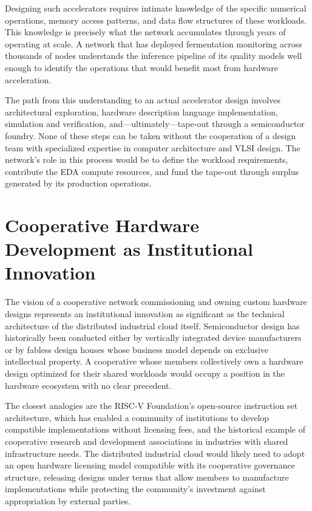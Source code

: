 \documentclass[12pt]{book}
\theoremstyle{definition}
\theoremstyle{remark}
\begin{document}
Designing such accelerators requires intimate knowledge of the
specific numerical operations, memory access patterns, and data
flow structures of these workloads. This knowledge is precisely
what the network accumulates through years of operating at scale.
A network that has deployed fermentation monitoring across thousands
of nodes understands the inference pipeline of its quality models
well enough to identify the operations that would benefit most
from hardware acceleration.

The path from this understanding to an actual accelerator design
involves architectural exploration, hardware description language
implementation, simulation and verification, and---ultimately---tape-out
through a semiconductor foundry. None of these steps can be taken
without the cooperation of a design team with specialized expertise
in computer architecture and VLSI design. The network's role in
this process would be to define the workload requirements, contribute
the EDA compute resources, and fund the tape-out through surplus
generated by its production operations.

\section{Cooperative Hardware Development as Institutional Innovation}

The vision of a cooperative network commissioning and owning custom
hardware designs represents an institutional innovation as
significant as the technical architecture of the distributed
industrial cloud itself. Semiconductor design has historically been
conducted either by vertically integrated device manufacturers or
by fabless design houses whose business model depends on exclusive
intellectual property. A cooperative whose members collectively
own a hardware design optimized for their shared workloads would
occupy a position in the hardware ecosystem with no clear precedent.

The closest analogies are the RISC-V Foundation's open-source
instruction set architecture, which has enabled a community of
institutions to develop compatible implementations without licensing
fees, and the historical example of cooperative research and
development associations in industries with shared infrastructure
needs. The distributed industrial cloud would likely need to adopt
an open hardware licensing model compatible with its cooperative
governance structure, releasing designs under terms that allow
members to manufacture implementations while protecting the
community's investment against appropriation by external parties.
\end{document}
